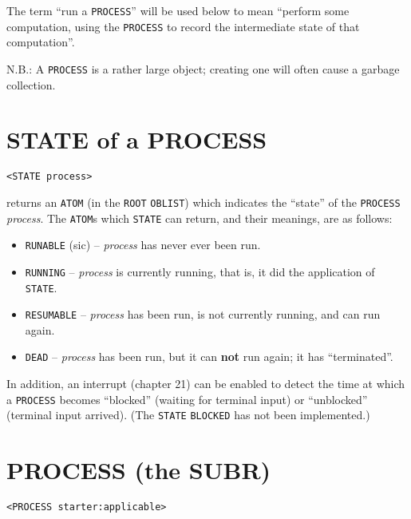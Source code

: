 \documentclass[a4paper]{scrbook}
\providecommand{\tightlist}{%
  \setlength{\itemsep}{0pt}\setlength{\parskip}{0pt}}
\begin{document}
The term ``run a \texttt{PROCESS}'' will be used below to mean ``perform some computation, using the \texttt{PROCESS} to
record the intermediate state of that computation''.

N.B.: A \texttt{PROCESS} is a rather large object; creating one will often cause a garbage collection.

\section{STATE of a PROCESS}\label{state-of-a-process}

\begin{verbatim}
<STATE process>
\end{verbatim}

 returns an \texttt{ATOM} (in the \texttt{ROOT} \texttt{OBLIST}) which indicates the ``state''
of the \texttt{PROCESS} \emph{process}. The \texttt{ATOM}s which \texttt{STATE} can return, and their meanings, are as
follows:

\begin{itemize}
\tightlist
\item
  \texttt{RUNABLE} (sic) -- \emph{process} has never ever been run.
\item
  \texttt{RUNNING} -- \emph{process} is currently running, that is, it did the application
  of \texttt{STATE}.
\item
  \texttt{RESUMABLE} -- \emph{process} has been run, is not currently running, and can run
  again.
\item
  \texttt{DEAD} -- \emph{process} has been run, but it can \textbf{not} run again; it has
  ``terminated''.
\end{itemize}

In addition, an interrupt (chapter 21) can be enabled to detect the time at which a \texttt{PROCESS} becomes ``blocked''
(waiting for terminal input) or ``unblocked'' (terminal input arrived). (The \texttt{STATE}
\texttt{BLOCKED} has not been implemented.)

\section{PROCESS (the SUBR)}\label{process-the-subr}

\begin{verbatim}
<PROCESS starter:applicable>
\end{verbatim}
\end{document}
